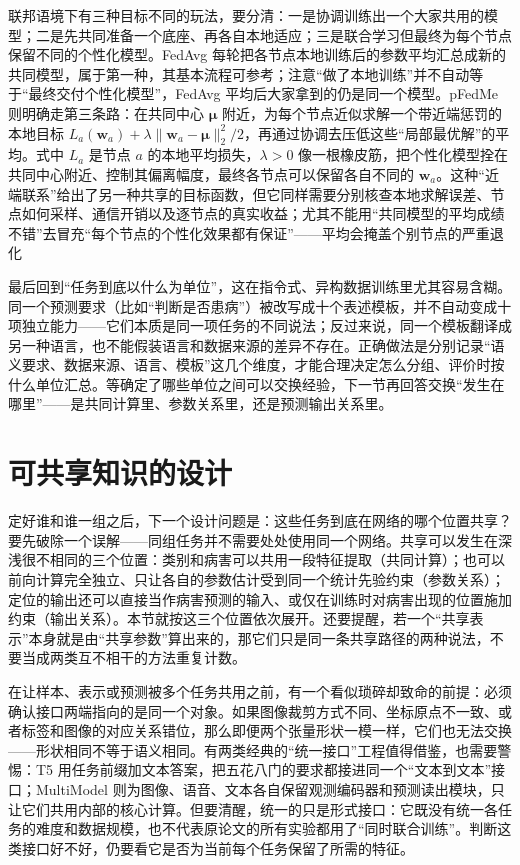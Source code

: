 联邦语境下有三种目标不同的玩法，要分清：一是协调训练出一个大家共用的模型；二是先共同准备一个底座、再各自本地适应；三是联合学习但最终为每个节点保留不同的个性化模型。FedAvg 每轮把各节点本地训练后的参数平均汇总成新的共同模型，属于第一种，其基本流程可参考；注意“做了本地训练”并不自动等于“最终交付个性化模型”，FedAvg 平均后大家拿到的仍是同一个模型。pFedMe 则明确走第三条路：在共同中心 $\bm\mu$ 附近，为每个节点近似求解一个带近端惩罚的本地目标 $L_a(\bm w_a)+\lambda\|\bm w_a-\bm\mu\|_2^2/2$，再通过协调去压低这些“局部最优解”的平均。式中 $L_a$ 是节点 $a$ 的本地平均损失，$\lambda>0$ 像一根橡皮筋，把个性化模型拴在共同中心附近、控制其偏离幅度，最终各节点可以保留各自不同的 $\bm w_a$。这种“近端联系”给出了另一种共享的目标函数，但它同样需要分别核查本地求解误差、节点如何采样、通信开销以及逐节点的真实收益；尤其不能用“共同模型的平均成绩不错”去冒充“每个节点的个性化效果都有保证”——平均会掩盖个别节点的严重退化

最后回到“任务到底以什么为单位”，这在指令式、异构数据训练里尤其容易含糊。同一个预测要求（比如“判断是否患病”）被改写成十个表述模板，并不自动变成十项独立能力——它们本质是同一项任务的不同说法；反过来说，同一个模板翻译成另一种语言，也不能假装语言和数据来源的差异不存在。正确做法是分别记录“语义要求、数据来源、语言、模板”这几个维度，才能合理决定怎么分组、评价时按什么单位汇总。等确定了哪些单位之间可以交换经验，下一节再回答交换“发生在哪里”——是共同计算里、参数关系里，还是预测输出关系里。

\section{可共享知识的设计}
\label{sec:ket-sharing-structure}

定好谁和谁一组之后，下一个设计问题是：这些任务到底在网络的哪个位置共享？要先破除一个误解——同组任务并不需要处处使用同一个网络。共享可以发生在深浅很不相同的三个位置：类别和病害可以共用一段特征提取（共同计算）；也可以前向计算完全独立、只让各自的参数估计受到同一个统计先验约束（参数关系）；定位的输出还可以直接当作病害预测的输入、或仅在训练时对病害出现的位置施加约束（输出关系）。本节就按这三个位置依次展开。还要提醒，若一个“共享表示”本身就是由“共享参数”算出来的，那它们只是同一条共享路径的两种说法，不要当成两类互不相干的方法重复计数。

在让样本、表示或预测被多个任务共用之前，有一个看似琐碎却致命的前提：必须确认接口两端指向的是同一个对象。如果图像裁剪方式不同、坐标原点不一致、或者标签和图像的对应关系错位，那么即便两个张量形状一模一样，它们也无法交换——形状相同不等于语义相同。有两类经典的“统一接口”工程值得借鉴，也需要警惕：T5 用任务前缀加文本答案，把五花八门的要求都接进同一个“文本到文本”接口；MultiModel 则为图像、语音、文本各自保留观测编码器和预测读出模块，只让它们共用内部的核心计算。但要清醒，统一的只是形式接口：它既没有统一各任务的难度和数据规模，也不代表原论文的所有实验都用了“同时联合训练”。判断这类接口好不好，仍要看它是否为当前每个任务保留了所需的特征。

